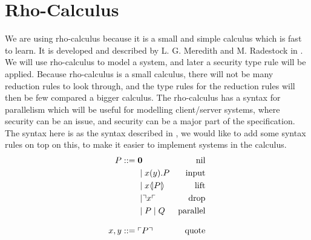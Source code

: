 \section{Rho-Calculus}\label{ch:rho-calculus}
We are using rho-calculus because it is a small and simple calculus which is fast to learn.
It is developed and described by L. G. Meredith and M. Radestock in \citep{Meredith2005}.
We will use rho-calculus to model a system, and later a security type rule will be applied.
Because rho-calculus is a small calculus, there will not be many reduction rules to look through, and the type rules for the reduction rules will then be few compared a bigger calculus.
The rho-calculus has a syntax for parallelism which will be useful for modelling client/server systems, where security can be an issue, and security can be a major part of the specification. 
The syntax here is as the syntax described in \citep{Meredith2005}, we would like to add some syntax rules on top on this, to make it easier to implement systems in the calculus.
\begin{align*}
    P  ::= \; &  \mathbf{0} & \text{nil} \\
      & \mid x(y).P & \text{input} \\
      & \mid x \langle \! | P | \! \rangle & \text{lift} \\
      & \mid \urcorner x \ulcorner & \text{drop} \\
      & \mid P \mid Q & \text{parallel} \\[3mm]
    x,y ::= \; & \ulcorner P \urcorner & \text{quote}\\
\end{align*}



